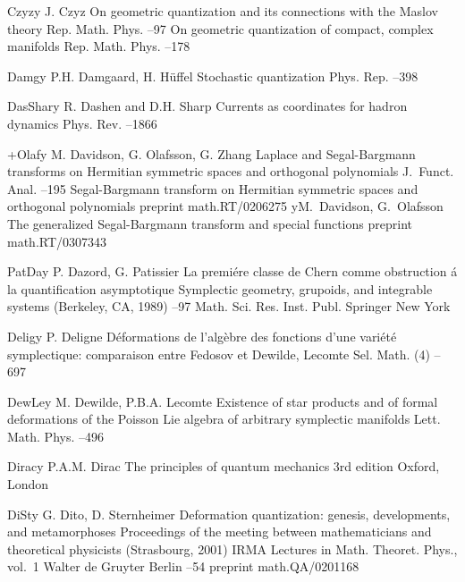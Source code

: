 \documentclass[12pt]{amsart}
\numberwithin{equation}{section}
\theoremstyle{remark}
\newcommand{\by}{\mathbf y}
\begin{document}
\begin{thebibliography}{199}
 Czyz\by{ J. Czyz \paper On geometric quantization and its connections
with the Maslov theory \jour Rep. Math. Phys.   --97
\moreref \paper On geometric quantization of compact, complex manifolds \jour
Rep. Math. Phys.   --178}

 Damg\by{ P.H. Damgaard, H. H\"uffel \paper Stochastic quantization \jour
Phys. Rep.   --398}

 DasShar\by{ R. Dashen and D.H. Sharp \paper Currents as coordinates for
hadron dynamics \jour Phys. Rev.   --1866}

 +Olaf\by{ M. Davidson, G. Olafsson, G. Zhang \paper Laplace and
Segal-Bargmann transforms on Hermitian symmetric spaces and orthogonal
polynomials \jour J.~Funct. Anal.   --195 \moreref
\paper Segal-Bargmann transform on Hermitian symmetric spaces and orthogonal
polynomials \paperinfo preprint math.RT/0206275 \moreref \by M.~Davidson,
G.~Olafsson \paper The generalized Segal-Bargmann transform and special
functions \paperinfo preprint math.RT/0307343}

 PatDa\by{ P. Dazord, G. Patissier \paper La premi\'ere classe de Chern
comme obstruction \'a la quantification asymptotique \inbook Symplectic
geometry, grupoids, and integrable systems (Berkeley, CA, 1989) --97
\bookinfo Math. Sci. Res. Inst. Publ.  \publ Springer \publaddr New York
}

 Delig\by{ P. Deligne \paper D\'eformations de l'alg\`ebre des fonctions
d'une vari\'et\'e symplectique: comparaison entre Fedosov et Dewilde, Lecomte
\jour Sel. Math.  (4)  --697}

 DewLe\by{ M. Dewilde, P.B.A. Lecomte \paper Existence of star products
and of formal deformations of the Poisson Lie algebra of arbitrary symplectic
manifolds \jour Lett. Math. Phys.   --496}

 Dirac\by{ P.A.M. Dirac \book The principles of quantum mechanics
\bookinfo 3rd edition \publaddr Oxford, London }

 DiSt\by{ G. Dito, D. Sternheimer \paper Deformation quantization:
genesis, developments, and metamorphoses \inbook Proceedings of the meeting
between mathematicians and theoretical physicists (Strasbourg, 2001) \bookinfo
IRMA Lectures in Math. Theoret. Phys., vol.~1 \publ Walter de Gruyter \publaddr
Berlin  --54 \paperinfo preprint math.QA/0201168}


\end{thebibliography}
\end{document}
